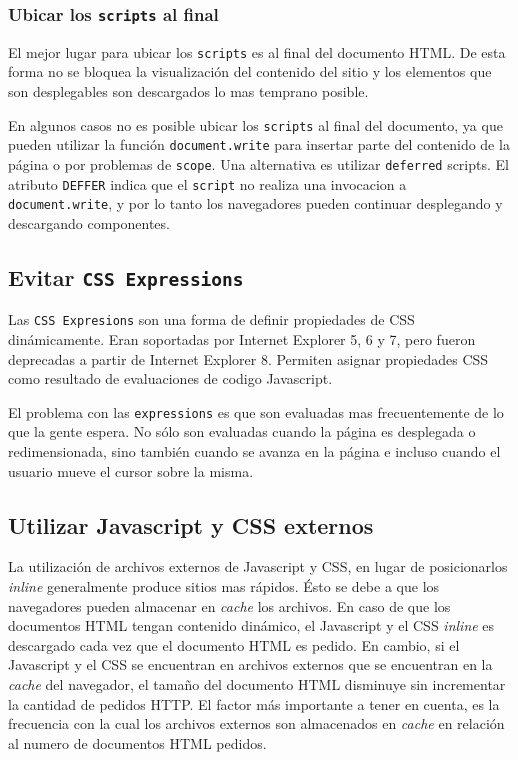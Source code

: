 \documentclass[a4paper,12pt]{report}
\begin{document}
\subsubsection{Ubicar los \texttt{scripts} al final}

El mejor lugar para ubicar los \texttt{scripts} es al final del documento HTML. De esta forma no se bloquea la visualización del contenido del sitio y los elementos
que son desplegables son descargados lo mas temprano posible.

En algunos casos no es posible ubicar los \texttt{scripts} al final del documento, ya que pueden utilizar la función \texttt{document.write} para insertar parte del
contenido de la página o por problemas de \texttt{scope}. Una alternativa es utilizar \texttt{deferred} scripts. El atributo \texttt{DEFFER} indica que el \texttt{script} no
realiza una invocacion a \texttt{document.write}, y por lo tanto los navegadores pueden continuar desplegando y descargando componentes.

\subsection{Evitar \texttt{CSS Expressions}}

Las \texttt{CSS Expresions} son una forma de definir propiedades de CSS dinámicamente. Eran soportadas por Internet Explorer 5, 6 y 7, pero fueron deprecadas a
partir de Internet Explorer 8. Permiten asignar propiedades CSS como resultado de evaluaciones de codigo Javascript.

El problema con las \texttt{expressions} es que son evaluadas mas frecuentemente de lo que la gente espera. No sólo son evaluadas cuando la página es desplegada o
redimensionada, sino también cuando se avanza en la página e incluso cuando el usuario mueve el cursor sobre la misma.

\subsection{Utilizar Javascript y CSS externos}

La utilización de archivos externos de Javascript y CSS, en lugar de posicionarlos \emph{inline} generalmente produce sitios mas rápidos. Ésto se debe a que los navegadores
pueden almacenar en \emph{cache} los archivos. En caso de que los documentos HTML tengan contenido dinámico, el Javascript y el CSS \emph{inline} es descargado
cada vez que el documento HTML es pedido. En cambio, si el Javascript y el CSS se encuentran en archivos externos que se encuentran en la \emph{cache} del navegador,
el tamaño del documento HTML disminuye sin incrementar la cantidad de pedidos HTTP. El factor más importante a tener en cuenta, es la frecuencia con la cual los
archivos externos son almacenados en \emph{cache} en relación al numero de documentos HTML pedidos.
\end{document}
